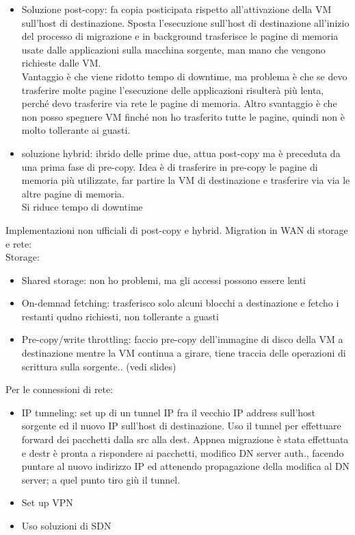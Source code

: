 \documentclass[16px]{article}
\begin{document}
\begin{itemize}
\item Soluzione post-copy: fa copia posticipata rispetto all'attivazione della VM sull'host di destinazione. Sposta l'esecuzione sull'host di destinazione all'inizio del processo di migrazione e in background trasferisce le pagine di memoria usate dalle applicazioni sulla macchina sorgente, man mano che vengono richieste dalle VM.\\ Vantaggio è che viene ridotto tempo di downtime, ma problema è che se devo trasferire molte pagine l'esecuzione delle applicazioni risulterà più lenta, perché devo trasferire via rete le pagine di memoria. Altro svantaggio è che non posso spegnere VM finché non ho trasferito tutte le pagine, quindi non è molto tollerante ai guasti.
\item soluzione hybrid: ibrido delle prime due, attua post-copy ma è preceduta da una prima fase di pre-copy. Idea è di trasferire in pre-copy le pagine di memoria più utilizzate, far partire la VM di destinazione e trasferire via via le altre pagine di memoria.\\ Si riduce tempo di downtime
\end{itemize}
Implementazioni non ufficiali di post-copy e hybrid.
Migration in WAN di storage e rete:\\
Storage:
\begin{itemize}
\item Shared storage: non ho problemi, ma gli accessi possono essere lenti
\item On-demnad fetching: trasferisco solo alcuni blocchi a destinazione e fetcho i restanti qudno richiesti,  non tollerante a guasti
\item Pre-copy/write throttling: faccio pre-copy dell'immagine di disco della VM a destinazione mentre la VM continua a girare, tiene traccia delle operazioni di scrittura sulla sorgente.. (vedi slides)
\end{itemize}
Per le connessioni di rete:
\begin{itemize}
\item IP tunneling: set up di un tunnel IP fra il vecchio IP address sull'host sorgente ed il nuovo IP sull'host di destinazione. Uso il tunnel per effettuare forward dei pacchetti dalla src alla dest. Appnea migrazione è stata effettuata e destr è pronta a rispondere ai pacchetti, modifico DN server auth., facendo puntare al nuovo indirizzo IP ed attenendo propagazione della modifica al DN server; a quel punto tiro giù il tunnel.
\item Set up VPN 
\item Uso soluzioni di SDN
\end{itemize}
\end{document}
